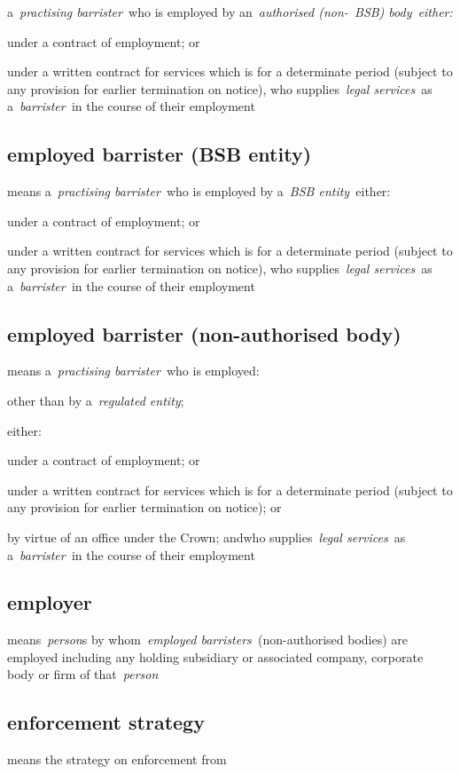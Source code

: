   a~\emph{practising barrister~}who is employed by an~\emph{authorised
  (non-~BSB) body~either:}
  \al \item under a contract of employment; or
  \item under a written contract for services which is for a determinate period (subject to any provision for earlier termination on notice),\la who supplies~\emph{legal services~}as a~\emph{barrister~}in
  the course of their employment  \subsection{employed barrister (BSB entity) } means a~\emph{practising
  barrister~}who is employed by a~\emph{BSB entity~}either: \al \item under a
  contract of employment; or \item under a written contract for services
  which is for a determinate period (subject to any provision for
  earlier termination on notice),\la who supplies~\emph{legal services~}as
  a~\emph{barrister~}in the course of their employment  \subsection{employed barrister (non-authorised body) } means
  a~\emph{practising barrister~}who is employed: \al \item other than by
  a~\emph{regulated entity}; \item either: \rl \item under a contract of
  employment; or \item under a written contract for services which is for
  a determinate period (subject to any provision for earlier termination
  on notice); or \item by virtue of an office under the Crown; and\lr\la who
  supplies~\emph{legal services~}as a~\emph{barrister~}in the course of
  their employment  \subsection{employer } means~\emph{person}s by whom~\emph{employed
  barristers~}(non-authorised bodies) are employed including any holding
  subsidiary or associated company, corporate body or firm of
  that~\emph{person} \subsection{enforcement strategy } means the strategy on enforcement from
